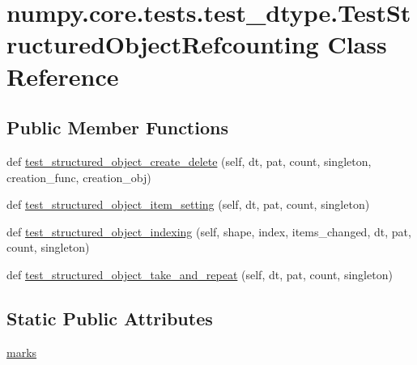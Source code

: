 \hypertarget{classnumpy_1_1core_1_1tests_1_1test__dtype_1_1TestStructuredObjectRefcounting}{}\section{numpy.\+core.\+tests.\+test\+\_\+dtype.\+Test\+Structured\+Object\+Refcounting Class Reference}
\label{classnumpy_1_1core_1_1tests_1_1test__dtype_1_1TestStructuredObjectRefcounting}
\subsection*{Public Member Functions}
\begin{DoxyCompactItemize}
\item 
def \hyperlink{classnumpy_1_1core_1_1tests_1_1test__dtype_1_1TestStructuredObjectRefcounting_a37512433dd04b39800a8c92610c57053}{test\+\_\+structured\+\_\+object\+\_\+create\+\_\+delete} (self, dt, pat, count, singleton, creation\+\_\+func, creation\+\_\+obj)
\item 
def \hyperlink{classnumpy_1_1core_1_1tests_1_1test__dtype_1_1TestStructuredObjectRefcounting_a26d2a38fd49f215b5c6da9a5863cd05e}{test\+\_\+structured\+\_\+object\+\_\+item\+\_\+setting} (self, dt, pat, count, singleton)
\item 
def \hyperlink{classnumpy_1_1core_1_1tests_1_1test__dtype_1_1TestStructuredObjectRefcounting_acf2144ab4d6416b6252c319a1083bf7c}{test\+\_\+structured\+\_\+object\+\_\+indexing} (self, shape, index, items\+\_\+changed, dt, pat, count, singleton)
\item 
def \hyperlink{classnumpy_1_1core_1_1tests_1_1test__dtype_1_1TestStructuredObjectRefcounting_aecd47eba12fa495ebefecd8d3adb6f8e}{test\+\_\+structured\+\_\+object\+\_\+take\+\_\+and\+\_\+repeat} (self, dt, pat, count, singleton)
\end{DoxyCompactItemize}
\subsection*{Static Public Attributes}
\begin{DoxyCompactItemize}
\item 
\hyperlink{classnumpy_1_1core_1_1tests_1_1test__dtype_1_1TestStructuredObjectRefcounting_a85e7a93f63811dbea44ec0de506bb316}{marks}
\end{DoxyCompactItemize}


